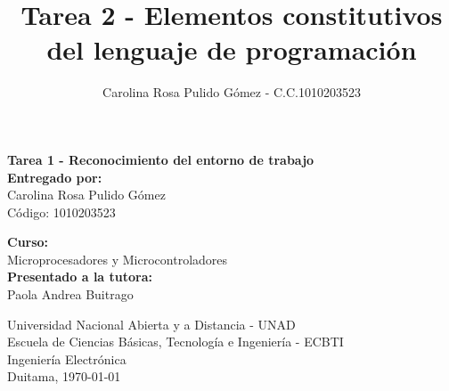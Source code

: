 \documentclass[stu, 12pt, letterpaper, donotrepeattitle, floatsintext]{apa7}
\title{Tarea 2 - Elementos constitutivos del lenguaje de programación}
\author{Carolina Rosa Pulido Gómez - C.C.1010203523}
\affiliation{Universidad Nacional Abierta y a Distancia UNAD - ECBTI}
\begin{document}
\begin{titlepage}
    \begin{Center}
        
    \vspace*{1cm} %
    
    {\bfseries Tarea 1 - Reconocimiento del entorno de trabajo}\\[2.5cm]
    
    {\textbf{Entregado por:}}\\
    {Carolina Rosa Pulido Gómez}\\[0.5cm]
    {Código: 1010203523}\\[2cm]
    
    \vfill

    {\textbf{Curso:}}\\
    {Microprocesadores y Microcontroladores}\\[0.5cm]
    {\textbf{Presentado a la tutora:}}\\
    {Paola Andrea Buitrago}\\[2cm]
    
    \vfill

    {Universidad Nacional Abierta y a Distancia - UNAD}\\
    {Escuela de Ciencias Básicas, Tecnología e Ingeniería - ECBTI}\\
    {Ingeniería Electrónica}\\
    {Duitama, \today}
    
    \end{Center}
\end{titlepage}

\setcounter{page}{2}

\setlength{\parindent}{1.27cm} 



\newpage
\printbibliography[title={\textbf{Referencias Bibliográficas}}]
\end{document}
